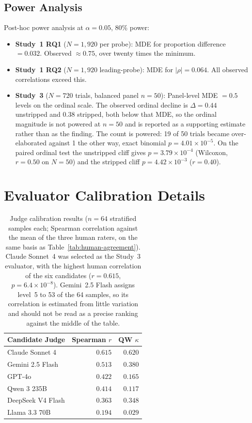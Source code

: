 \subsection{Power Analysis}

Post-hoc power analysis at $\alpha = 0.05$, 80\% power:
\begin{itemize}
    \item \textbf{Study~1 RQ1} ($N = 1{,}920$ per probe): MDE for proportion difference $= 0.032$. Observed $\approx 0.75$, over twenty times the minimum.
    \item \textbf{Study~1 RQ2} ($N = 1{,}920$ leading-probe): MDE for $|\rho| = 0.064$. All observed correlations exceed this.
    \item \textbf{Study~3} ($N = 720$ trials, balanced panel $n = 50$): Panel-level MDE $= 0.5$ levels on the ordinal scale. The observed ordinal decline is $\Delta = 0.44$ unstripped and $0.38$ stripped, both below that MDE, so the ordinal magnitude is not powered at $n = 50$ and is reported as a supporting estimate rather than as the finding. The count is powered: 19 of 50 trials became over-elaborated against 1 the other way, exact binomial $p = 4.01 \times 10^{-5}$. On the paired ordinal test the unstripped cliff gives $p = 3.79 \times 10^{-4}$ (Wilcoxon, $r = 0.50$ on $N = 50$) and the stripped cliff $p = 4.42 \times 10^{-3}$ ($r = 0.40$).
\end{itemize}

\section{Evaluator Calibration Details}
\label{sec:evaluator-calibration}
\label{sec:appendix-judge}

\begin{table}[h]
\centering
\small
\begin{tabular}{@{}lrr@{}}
\toprule
\textbf{Candidate Judge} & \textbf{Spearman $r$} & \textbf{QW $\kappa$} \\
\midrule
Claude Sonnet 4 & $0.615$ & $0.620$ \\
Gemini 2.5 Flash & $0.513$ & $0.380$ \\
GPT-4o & $0.422$ & $0.165$ \\
Qwen 3 235B & $0.414$ & $0.117$ \\
DeepSeek V4 Flash & $0.363$ & $0.348$ \\
Llama 3.3 70B & $0.194$ & $0.029$ \\
\bottomrule
\end{tabular}
\caption{Judge calibration results ($n = 64$ stratified samples each; Spearman correlation against the mean of the three human raters, on the same basis as Table~\ref{tab:human-agreement}). Claude Sonnet~4 was selected as the Study~3 evaluator, with the highest human correlation of the six candidates ($r = 0.615$, $p = 6.4 \times 10^{-8}$). Gemini~2.5 Flash assigns level~5 to 53 of the 64 samples, so its correlation is estimated from little variation and should not be read as a precise ranking against the middle of the table.}
\label{tab:judge-calibration}
\end{table}

